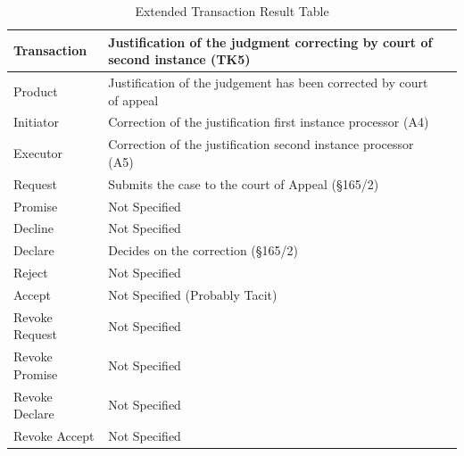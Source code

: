 \begin{landscape}
\begin{table}[h]
\caption{Extended Transaction Result Table}
\label{tab:etrt}
\begin{tabular}{|l||l|l|}
\hline
Transaction  & Justification of the judgment correcting by court of second instance  (TK5) \\ \hline
Product      & Justification of the judgement has been corrected by court of appeal  \\ \hline
Initiator      &  Correction of the justification first instance processor (A4) \\ \hline
Executor       &  Correction of the justification second instance processor (A5) \\ \hline
Request        &   Submits the case to the court of Appeal (\S165/2)    \\ \hline
Promise        &  Not Specified  \\ \hline
Decline        &  Not Specified   \\ \hline
Declare        & Decides on the correction (\S165/2)  \\ \hline
Reject         &  Not Specified   \\ \hline
Accept         & Not Specified (Probably Tacit) \\ \hline
Revoke Request & Not Specified       \\ \hline
Revoke Promise & Not Specified  \\ \hline
Revoke Declare & Not Specified      \\ \hline
Revoke Accept  &  Not Specified \\ \hline
\end{tabular}
\end{table}


\end{landscape}
